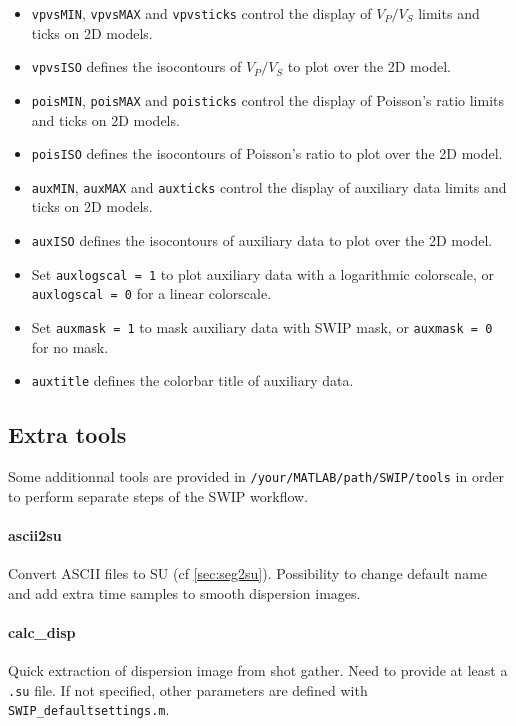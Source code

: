 \documentclass[twoside,a4paper]{article}
\begin{document}
\begin{itemize}[leftmargin=*]
\item \verb|vpvsMIN|, \verb|vpvsMAX| and \verb|vpvsticks| control the display of $V_P/V_S$ limits and ticks on 2D models.

\item \verb|vpvsISO| defines the isocontours of $V_P/V_S$ to plot over the 2D model.

\item \verb|poisMIN|, \verb|poisMAX| and \verb|poisticks| control the display of Poisson's ratio limits and ticks on 2D models.

\item \verb|poisISO| defines the isocontours of Poisson's ratio to plot over the 2D model.

\item \verb|auxMIN|, \verb|auxMAX| and \verb|auxticks| control the display of auxiliary data limits and ticks on 2D models.

\item \verb|auxISO| defines the isocontours of auxiliary data to plot over the 2D model.

\item Set \verb|auxlogscal = 1| to plot auxiliary data with a logarithmic colorscale, or \verb|auxlogscal = 0| for a linear colorscale.

\item Set \verb|auxmask = 1| to mask auxiliary data with SWIP mask, or \verb|auxmask = 0| for no mask.

\item \verb|auxtitle| defines the colorbar title of auxiliary data.

\end{itemize}

\clearpage
\subsection{Extra tools}
Some additionnal tools are provided in \verb|/your/MATLAB/path/SWIP/tools| in order to perform separate steps of the SWIP workflow.

\paragraph{ascii2su}
Convert ASCII files to SU (cf \ref{sec:seg2su}). Possibility to change default name and add extra time samples to smooth dispersion images.

\paragraph{calc\_disp}
Quick extraction of dispersion image from shot gather. Need to provide at least a \verb|.su| file. If not specified, other parameters are defined with \verb|SWIP_defaultsettings.m|.
\end{document}
